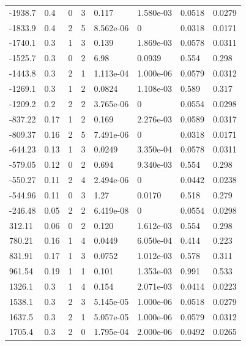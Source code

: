 \documentclass[preview]{standalone}
\begin{document}
{{\begin{tabular}{L{1.2cm}C{1.2cm} C{0.3cm}C{0.5cm} C{1.4cm}C{1.4cm} C{1.4cm}C{1.4cm}}
  -1938.7  &   0.4  & 0     &  3 &  0.117  & 1.580e-03  & 0.0518 &  0.0279   \\ 
  -1833.9  &   0.4  & 2     &  5 &  8.562e-06  & 0  & 0.0318 &  0.0171   \\ 
  -1740.1  &   0.3  & 1     &  3 &  0.139  & 1.869e-03  & 0.0578 &  0.0311   \\ 
  -1525.7  &   0.3  & 0     &  2 &  6.98  & 0.0939  & 0.554 &  0.298   \\ 
  -1443.8  &   0.3  & 2     &  1 &  1.113e-04  & 1.000e-06  & 0.0579 &  0.0312   \\ 
  -1269.1  &   0.3  & 1     &  2 &  0.0824  & 1.108e-03  & 0.589 &  0.317   \\ 
  -1209.2  &   0.2  & 2     &  2 &  3.765e-06  & 0  & 0.0554 &  0.0298   \\ 
  -837.22  &  0.17  & 1     &  2 &  0.169  & 2.276e-03  & 0.0589 &  0.0317   \\ 
  -809.37  &  0.16  & 2     &  5 &  7.491e-06  & 0  & 0.0318 &  0.0171   \\ 
  -644.23  &  0.13  & 1     &  3 &  0.0249  & 3.350e-04  & 0.0578 &  0.0311   \\ 
  -579.05  &  0.12  & 0     &  2 &  0.694  & 9.340e-03  & 0.554 &  0.298   \\ 
  -550.27  &  0.11  & 2     &  4 &  2.494e-06  & 0  & 0.0442 &  0.0238   \\ 
  -544.96  &  0.11  & 0     &  3 &  1.27  & 0.0170  & 0.518 &  0.279   \\ 
  -246.48  &  0.05  & 2     &  2 &  6.419e-08  & 0  & 0.0554 &  0.0298   \\ 
  312.11  &  0.06  & 0     &  2 &  0.120  & 1.612e-03  & 0.554 &  0.298   \\ 
  780.21  &  0.16  & 1     &  4 &  0.0449  & 6.050e-04  & 0.414 &  0.223   \\ 
  831.91  &  0.17  & 1     &  3 &  0.0752  & 1.012e-03  & 0.578 &  0.311   \\ 
  961.54  &  0.19  & 1     &  1 &  0.101  & 1.353e-03  & 0.991 &  0.533   \\ 
  1326.1  &   0.3  & 1     &  4 &  0.154  & 2.071e-03  & 0.0414 &  0.0223   \\ 
  1538.1  &   0.3  & 2     &  3 &  5.145e-05  & 1.000e-06  & 0.0518 &  0.0279   \\ 
  1637.5  &   0.3  & 2     &  1 &  5.057e-05  & 1.000e-06  & 0.0579 &  0.0312   \\ 
  1705.4  &   0.3  & 2     &  0 &  1.795e-04  & 2.000e-06  & 0.0492 &  0.0265   \\ 

\end{tabular}}}
\end{document}
